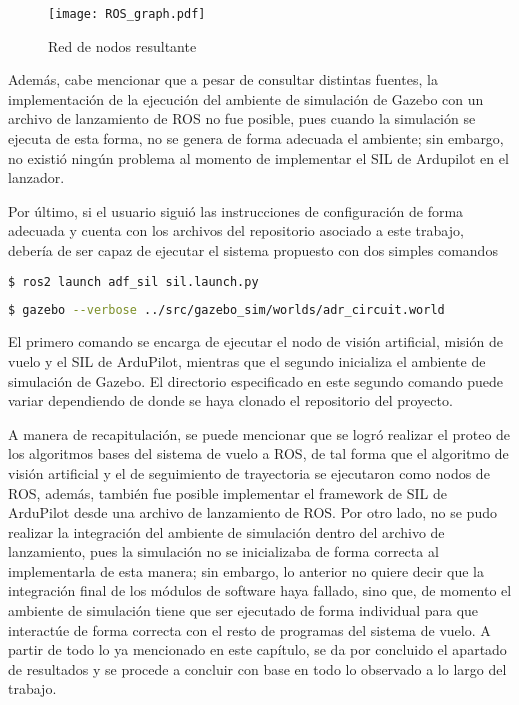 \begin{figure}[ht]
    \centering
    \texttt{[image: ROS\_graph.pdf]}
    \caption{Red de nodos resultante}
    \label{fig:ROS_graph}
\end{figure}


Además, cabe mencionar que a pesar de consultar distintas fuentes, la implementación de la ejecución del ambiente de simulación de Gazebo con un archivo de lanzamiento de ROS no fue posible, pues cuando la simulación se ejecuta de esta forma, no se genera de forma adecuada el ambiente; sin embargo, no existió ningún problema al momento de implementar el SIL de Ardupilot en el lanzador.

Por último, si el usuario siguió las instrucciones de configuración de forma adecuada y cuenta con los archivos del repositorio asociado a este trabajo, debería de ser capaz de ejecutar el sistema propuesto con dos simples comandos

\begin{lstlisting}[language = bash]
    $ ros2 launch adf_sil sil.launch.py
\end{lstlisting}

\begin{lstlisting}[language = bash]
    $ gazebo --verbose ../src/gazebo_sim/worlds/adr_circuit.world
\end{lstlisting}


El primero comando se encarga de ejecutar el nodo de visión artificial, misión de vuelo y el SIL de ArduPilot, mientras que el segundo inicializa el ambiente de simulación de Gazebo. El directorio especificado en este segundo comando puede variar dependiendo de donde se haya clonado el repositorio del proyecto.

A manera de recapitulación, se puede mencionar que se logró realizar el proteo de los algoritmos bases del sistema de vuelo a ROS, de tal forma que el algoritmo de visión artificial y el de seguimiento de trayectoria se ejecutaron como nodos de ROS, además, también fue posible implementar el framework de SIL de ArduPilot desde una archivo de lanzamiento de ROS. Por otro lado, no se pudo realizar la integración del ambiente de simulación dentro del archivo de lanzamiento, pues la simulación no se inicializaba de forma correcta al implementarla de esta manera; sin embargo, lo anterior no quiere decir que la integración final de los módulos de software haya fallado, sino que, de momento el ambiente de simulación tiene que ser ejecutado de forma individual para que interactúe de forma correcta con el resto de programas del sistema de vuelo.
A partir de todo lo ya mencionado en este capítulo, se da por concluido el apartado de resultados y se procede a concluir con base en todo lo observado a lo largo del trabajo.
